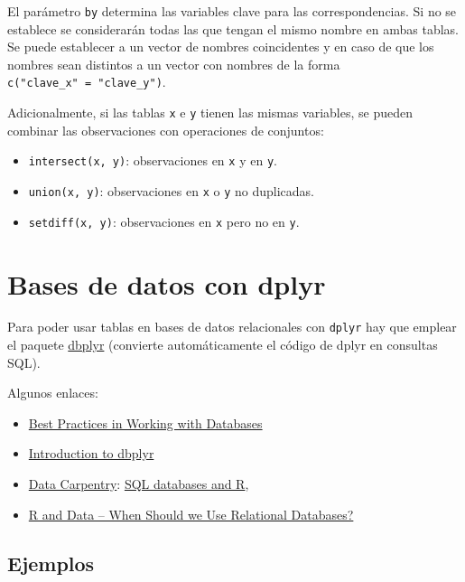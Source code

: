 \documentclass[
]{book}
\begin{document}
El parámetro \texttt{by} determina las variables clave para las correspondencias.
Si no se establece se considerarán todas las que tengan el mismo nombre en ambas tablas.
Se puede establecer a un vector de nombres coincidentes y en caso de que los nombres sean distintos a un vector con nombres de la forma \texttt{c("clave\_x"\ =\ "clave\_y")}.

Adicionalmente, si las tablas \texttt{x} e \texttt{y} tienen las mismas variables, se pueden combinar las observaciones con operaciones de conjuntos:

\begin{itemize}
\item
  \texttt{intersect(x,\ y)}: observaciones en \texttt{x} y en \texttt{y}.
\item
  \texttt{union(x,\ y)}: observaciones en \texttt{x} o \texttt{y} no duplicadas.
\item
  \texttt{setdiff(x,\ y)}: observaciones en \texttt{x} pero no en \texttt{y}.
\end{itemize}

\section{Bases de datos con dplyr}\label{dbplyr}

Para poder usar tablas en bases de datos relacionales con \texttt{dplyr} hay que emplear el paquete \href{https://dbplyr.tidyverse.org}{dbplyr} (convierte automáticamente el código de dplyr en consultas SQL).

Algunos enlaces:

\begin{itemize}
\item
  \href{https://solutions.posit.co/connections/db}{Best Practices in Working with Databases}
\item
  \href{https://dbplyr.tidyverse.org/articles/dbplyr.html}{Introduction to dbplyr}
\item
  \href{https://datacarpentry.org/R-ecology-lesson/index.html}{Data Carpentry}:
  \href{https://datacarpentry.org/R-ecology-lesson/05-r-and-databases.html}{SQL databases and R},
\item
  \href{https://intellixus.com/2018/06/29/r-and-data-when-should-we-use-relational-databases}{R and Data -- When Should we Use Relational Databases?}
\end{itemize}

\subsection{Ejemplos}\label{ejemplos}
\end{document}
